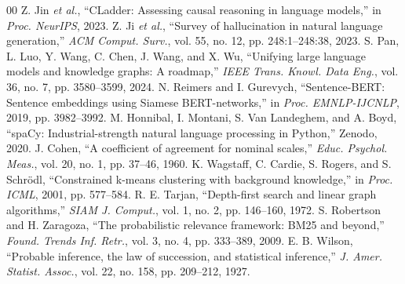 \documentclass[conference]{IEEEtran}
\begin{document}
\begin{thebibliography}{00}
 Z. Jin \textit{et al.}, ``CLadder: Assessing causal reasoning in language
models,'' in \textit{Proc. NeurIPS}, 2023.
 Z. Ji \textit{et al.}, ``Survey of hallucination in natural language
generation,'' \textit{ACM Comput. Surv.}, vol. 55, no. 12, pp. 248:1--248:38, 2023.
 S. Pan, L. Luo, Y. Wang, C. Chen, J. Wang, and X. Wu, ``Unifying large language models
and knowledge graphs: A roadmap,'' \textit{IEEE Trans. Knowl. Data Eng.}, vol. 36, no. 7,
pp. 3580--3599, 2024.
 N. Reimers and I. Gurevych, ``Sentence-BERT: Sentence embeddings using Siamese
BERT-networks,'' in \textit{Proc. EMNLP-IJCNLP}, 2019, pp. 3982--3992.
 M. Honnibal, I. Montani, S. Van Landeghem, and A. Boyd, ``spaCy: Industrial-strength
natural language processing in Python,'' Zenodo, 2020.
 J. Cohen, ``A coefficient of agreement for nominal scales,'' \textit{Educ. Psychol.
Meas.}, vol. 20, no. 1, pp. 37--46, 1960.
 K. Wagstaff, C. Cardie, S. Rogers, and S. Schr\"{o}dl, ``Constrained k-means
clustering with background knowledge,'' in \textit{Proc. ICML}, 2001, pp. 577--584.
 R. E. Tarjan, ``Depth-first search and linear graph algorithms,'' \textit{SIAM J.
Comput.}, vol. 1, no. 2, pp. 146--160, 1972.
 S. Robertson and H. Zaragoza, ``The probabilistic relevance framework: BM25 and
beyond,'' \textit{Found. Trends Inf. Retr.}, vol. 3, no. 4, pp. 333--389, 2009.
 E. B. Wilson, ``Probable inference, the law of succession, and statistical
inference,'' \textit{J. Amer. Statist. Assoc.}, vol. 22, no. 158, pp. 209--212, 1927.
\end{thebibliography}
\end{document}
